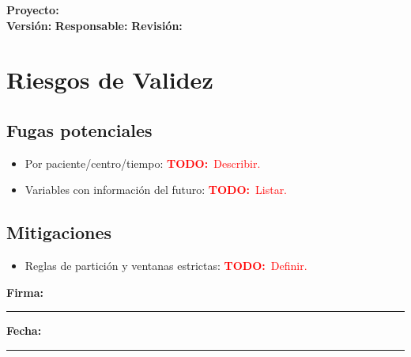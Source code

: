 \documentclass[11pt]{article}
\newcommand{\project}{\textbf{Proyecto:} \underline{\hspace{7cm}}}
\newcommand{\version}{\textbf{Versi\'on:} \underline{\hspace{3cm}}}
\newcommand{\owner}{\textbf{Responsable:} \underline{\hspace{5cm}}}
\newcommand{\review}{\textbf{Revisi\'on:} \underline{\hspace{3cm}}}
\newcommand{\signatureline}{\vspace{0.5cm}\noindent\textbf{Firma:}\ \rule{6cm}{0.4pt} \hfill \textbf{Fecha:}\ \rule{3cm}{0.4pt}}
\newcommand{\todo}[1]{\textcolor{red}{\textbf{TODO:}~#1}}
\begin{document}
\begin{flushright}
\project \\ \version \hspace{1cm} \owner \hspace{1cm} \review
\end{flushright}


\section*{Riesgos de Validez}
\subsection*{Fugas potenciales}
\begin{itemize}
  \item Por paciente/centro/tiempo: \todo{Describir.}
  \item Variables con informaci\'on del futuro: \todo{Listar.}
\end{itemize}
\subsection*{Mitigaciones}
\begin{itemize}
  \item Reglas de partici\'on y ventanas estrictas: \todo{Definir.}
\end{itemize}
\signatureline

\label{LastPage}
\end{document}
